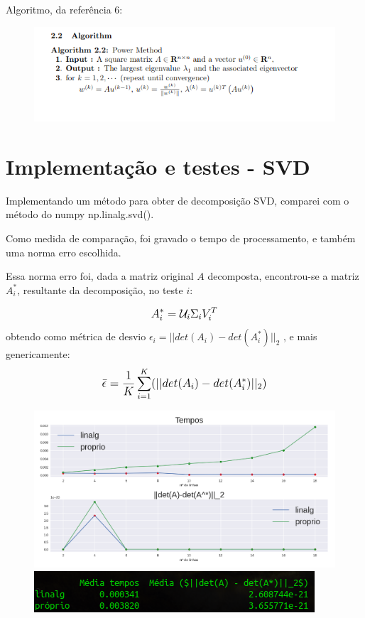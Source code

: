 \documentclass{article}
\begin{document}
Algoritmo, da referência 6:
\begin{figure}[H]
\begin{center}
  \includegraphics[width=1\linewidth]{images/algoritmo_svd_power_method.png}
\end{center}
\end{figure}

\pagebreak


\section{Implementação e testes - SVD}

\hfill

Implementando um método para obter de decomposição SVD, comparei com o método do numpy np.linalg.svd().

Como medida de comparação, foi gravado o tempo de processamento, e também uma norma erro escolhida.

Essa norma erro foi, dada a matriz original $A$ decomposta, encontrou-se a matriz $A_i^*$, resultante da decomposição, no teste $i$:

\begin{equation}
    \mathlarger{
   A_i^* = \mathcal{U}_i \Sigma_i V_i^T
    }
\end{equation}
obtendo como métrica de desvio $ \epsilon_i = || det(A_i) - det(A_i^*) ||_2$ , e mais genericamente:
\begin{equation}
    \mathlarger{
    \bar{\epsilon} = \frac{1}{K}\sum_{i=1}^{K}(|| det(A_i) - det(A_i^*) ||_2)
    }
\end{equation}

\begin{figure}[H]
\begin{center}
  \includegraphics[width=1\linewidth]{images/Figure_1.png}
  \includegraphics[width=0.6\linewidth]{images/df.png}
\end{center}
\end{figure}
\end{document}
